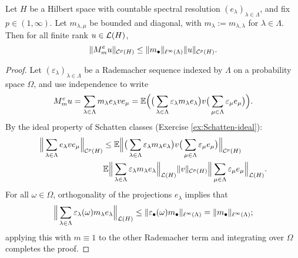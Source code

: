 \begin{lem}\label{lem:schur-diag}
  Let $H$ be a Hilbert space with countable spectral resolution $(e_{\lambda})_{\lambda \in \Lambda}$, and fix $p \in (1,\infty)$.
  Let $m_{\lambda,\mu}$ be bounded and diagonal, with $m_{\lambda} := m_{\lambda,\lambda}$ for $\lambda \in \Lambda$.
  Then for all finite rank $u \in \mathcal{L}(H)$,
  \begin{equation*}
    \|M_{m}^{e} u\|_{\mathcal{C}^{p}(H)} \leq \|m_{\bullet}\|_{\ell^\infty(\Lambda)} \|u\|_{\mathcal{C}^{p}(H)}.
  \end{equation*}
\end{lem}

\begin{proof}
  Let $(\varepsilon_{\lambda})_{\lambda \in \Lambda}$ be a Rademacher sequence indexed by $\Lambda$ on a probability space $\Omega$, and use independence to write
  \begin{equation*}
    M_{m}^{e} u = \sum_{\lambda \in \Lambda} m_{\lambda} e_{\lambda} v e_{\mu} = \mathbb{E} \Big( \big(\sum_{\lambda \in \Lambda} \varepsilon_{\lambda} m_{\lambda} e_{\lambda} \big) v \big(\sum_{\mu \in \Lambda} \varepsilon_{\mu} e_{\mu} \big) \Big).
  \end{equation*}
  By the ideal property of Schatten classes (Exercise \ref{ex:Schatten-ideal}):
  \begin{equation*}
    \begin{aligned}
    \Big\| \sum_{\lambda \in \Lambda} e_{\lambda} v e_{\mu} \Big\|_{\mathcal{C}^{p}(H)}
    &\leq \mathbb{E} \Big\| \big(\sum_{\lambda \in \Lambda} \varepsilon_{\lambda} m_{\lambda} e_{\lambda} \big) v \big(\sum_{\mu \in \Lambda} \varepsilon_{\mu} e_{\mu} \big) \Big\|_{\mathcal{C}^{p}(H)} \\
    &\mathbb{E} \Big\| \sum_{\lambda \in \Lambda} \varepsilon_{\lambda} m_{\lambda} e_{\lambda} \Big\|_{\mathcal{L}(H)} \|v\|_{\mathcal{C}^{p}(H)} \Big\| \sum_{\mu \in \Lambda} \varepsilon_{\mu} e_{\mu} \Big\|_{\mathcal{L}(H)}.
  \end{aligned}
\end{equation*}
For all $\omega \in \Omega$, orthogonality of the projections $e_{\lambda}$ implies that
\begin{equation*}
  \Big\| \sum_{\lambda \in \Lambda} \varepsilon_{\lambda}(\omega) m_{\lambda} e_{\lambda} \Big\|_{\mathcal{L}(H)} \leq \|\varepsilon_{\bullet} (\omega) m_{\bullet}\|_{\ell^\infty(\Lambda)} = \| m_{\bullet}\|_{\ell^\infty(\Lambda)};
\end{equation*}
applying this with $m \equiv 1$ to the other Rademacher term and integrating over $\Omega$ completes the proof.
\end{proof}

